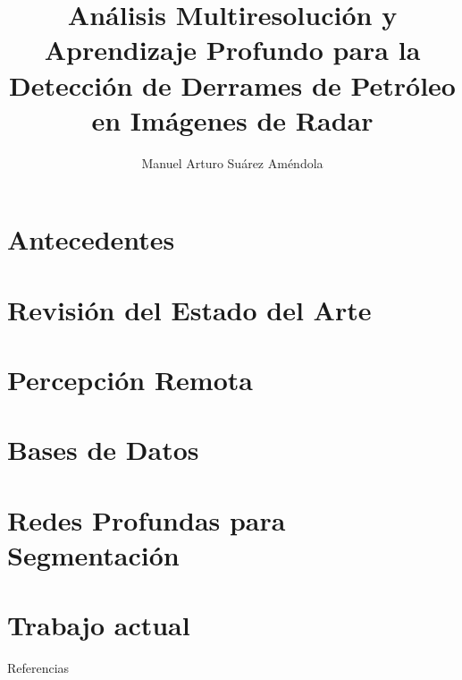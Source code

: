 \documentclass[11pt]{beamer}
\title[CIMAT - UAM I]
{Análisis Multiresolución y Aprendizaje Profundo para la Detección de Derrames de Petróleo en Imágenes de Radar}
\author[Suárez, Arturo]{Manuel Arturo Suárez Améndola}
\begin{document}


\section{Antecedentes}


\section{Revisión del Estado del Arte}


\section{Percepción Remota}


\section{Bases de Datos}


\section{Redes Profundas para Segmentación}


%

\section{Trabajo actual}


\nocite{*}
\begin{frame}[allowframebreaks]{Referencias}


\end{frame}
\end{document}

